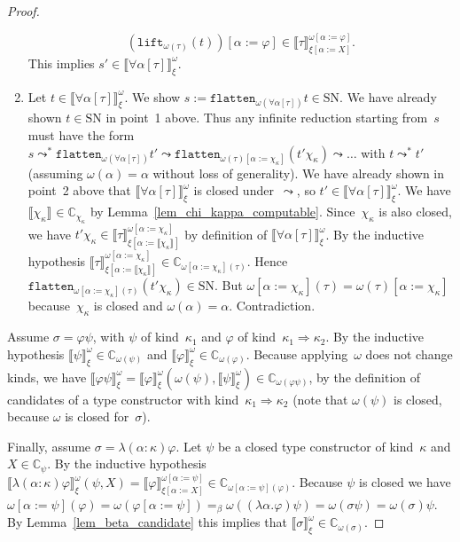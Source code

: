 \documentclass[runningheads,a4paper]{llncs}
\newcommand{\arrkind}{\Rightarrow}
\newcommand{\subst}[2]{#1:=#2}
\newcommand{\flatten}{\mathtt{flatten}}
\newcommand{\lift}{\mathtt{lift}}
\newcommand{\SN}{\mathrm{SN}}
\newcommand{\Cb}{\mathbb{C}}
\newcommand{\val}[3]{\ensuremath{\llbracket#1\rrbracket_{#2}^{#3}}}
\begin{document}
\begin{proof}
\begin{enumerate}
\[    (\lift_{\omega(\tau)}(t))[\subst{\alpha}{\varphi}] \in
    \val{\tau}{\xi[\subst{\alpha}{X}]}{\omega[\subst{\alpha}{\varphi}]}.
    \]
    This implies $s' \in \val{\forall\alpha[\tau]}{\xi}{\omega}$.
  \item Let $t \in \val{\forall\alpha[\tau]}{\xi}{\omega}$. We show $s
    := \flatten_{\omega(\forall\alpha[\tau])}t \in \SN$. We have
    already shown $t \in \SN$ in point~1 above. Thus any infinite
    reduction starting from~$s$ must have the form $s \leadsto^*
    \flatten_{\omega(\forall\alpha[\tau])}t' \leadsto
    \flatten_{\omega(\tau)[\subst{\alpha}{\chi_\kappa}]}(t'
    \chi_\kappa) \leadsto \ldots$ with $t \leadsto^* t'$ (assuming
    $\omega(\alpha) = \alpha$ without loss of generality). We have
    already shown in point~2 above that
    $\val{\forall\alpha[\tau]}{\xi}{\omega}$ is closed
    under~$\leadsto$, so $t' \in
    \val{\forall\alpha[\tau]}{\xi}{\omega}$. We have
    $\val{\chi_\kappa}{}{} \in \Cb_{\chi_\kappa}$ by
    Lemma~\ref{lem_chi_kappa_computable}. Since~$\chi_\kappa$ is also
    closed, we have $t' \chi_\kappa \in
    \val{\tau}{\xi[\subst{\alpha}{\val{\chi_\kappa}{}{}}]}{\omega[\subst{\alpha}{\chi_\kappa}]}$
    by definition of $\val{\forall\alpha[\tau]}{\xi}{\omega}$. By the
    inductive hypothesis
    $\val{\tau}{\xi[\subst{\alpha}{\val{\chi_\kappa}{}{}}]}{\omega[\subst{\alpha}{\chi_\kappa}]}
    \in \Cb_{\omega[\subst{\alpha}{\chi_\kappa}](\tau)}$. Hence
    $\flatten_{\omega[\subst{\alpha}{\chi_\kappa}](\tau)}(t'\chi_\kappa)\in\SN$. But
    $\omega[\subst{\alpha}{\chi_\kappa}](\tau) =
    \omega(\tau)[\subst{\alpha}{\chi_\kappa}]$ because~$\chi_\kappa$
    is closed and $\omega(\alpha) = \alpha$. Contradiction.
  \end{enumerate}

  Assume $\sigma = \varphi\psi$, with $\psi$ of kind~$\kappa_1$ and
  $\varphi$ of kind~$\kappa_1\arrkind\kappa_2$. By the inductive
  hypothesis $\val{\psi}{\xi}{\omega} \in \Cb_{\omega(\psi)}$ and
  $\val{\varphi}{\xi}{\omega} \in \Cb_{\omega(\varphi)}$. Because
  applying~$\omega$ does not change kinds, we have
  $\val{\varphi\psi}{\xi}{\omega} =
  \val{\varphi}{\xi}{\omega}(\omega(\psi), \val{\psi}{\xi}{\omega})
  \in \Cb_{\omega(\varphi\psi)}$, by the definition of candidates of a
  type constructor with kind~$\kappa_1\arrkind\kappa_2$ (note that
  $\omega(\psi)$ is closed, because $\omega$ is closed for~$\sigma$).

  Finally, assume $\sigma = \lambda(\alpha:\kappa)\varphi$. Let $\psi$
  be a closed type constructor of kind~$\kappa$ and $X \in
  \Cb_{\psi}$. By the inductive hypothesis
  $\val{\lambda(\alpha:\kappa)\varphi}{\xi}{\omega}(\psi,X) =
  \val{\varphi}{\xi[\subst{\alpha}{X}]}{\omega[\subst{\alpha}{\psi}]}
  \in \Cb_{\omega[\subst{\alpha}{\psi}](\varphi)}$. Because $\psi$ is
  closed we have $\omega[\subst{\alpha}{\psi}](\varphi) =
  \omega(\varphi[\subst{\alpha}{\psi}]) =_\beta
  \omega((\lambda\alpha.\varphi)\psi) = \omega(\sigma\psi) =
  \omega(\sigma)\psi$. By Lemma~\ref{lem_beta_candidate} this implies
  that $\val{\sigma}{\xi}{\omega} \in \Cb_{\omega(\sigma)}$.
\end{proof}
\end{document}
